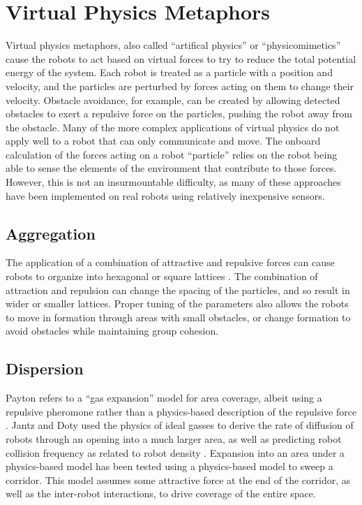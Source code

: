 \documentclass[]{article}
\begin{document}
\section{Virtual Physics Metaphors} \label{virt_phys}

Virtual physics metaphors, also called ``artifical physics'' or ``physicomimetics'' cause the robots to act based on virtual forces to try to reduce the total potential energy of the system. 
Each robot is treated as a particle with a position and velocity, and the particles are perturbed by forces acting on them to change their velocity. 
Obstacle avoidance, for example, can be created by allowing detected obstacles to exert a repulsive force on the particles, pushing the robot away from the obstacle. 
Many of the more complex applications of virtual physics do not apply well to a robot that can only communicate and move.
The onboard calculation of the forces acting on a robot ``particle'' relies on the robot being able to sense the elements of the environment that contribute to those forces. 
However, this is not an insurmountable difficulty, as many of these approaches have been implemented on real robots using relatively inexpensive sensors. 

\subsection{Aggregation}

The application of a combination of attractive and repulsive forces can cause robots to organize into hexagonal or square lattices \cite{spears2004overview}.
The combination of attraction and repulsion can change the spacing of the particles, and so result in wider or smaller lattices. 
Proper tuning of the parameters also allows the robots to move in formation through areas with small obstacles, or change formation to avoid obstacles while maintaining group cohesion. 
 
\subsection{Dispersion}

Payton refers to a ``gas expansion'' model for area coverage, albeit using a repulsive pheromone rather than a physics-based description of the repulsive force \cite{payton2001pheromone}. 
Jantz and Doty used the physics of ideal gasses to derive the rate of diffusion of robots through an opening into a much larger area, as well as predicting robot collision frequency as related to robot density \cite{jantz1997kinetics}. 
Expansion into an area under a physics-based model has been tested using a physics-based model to sweep a corridor\cite{spears2006physics}.
This model assumes some attractive force at the end of the corridor, as well as the inter-robot interactions, to drive coverage of the entire space. 
\end{document}
